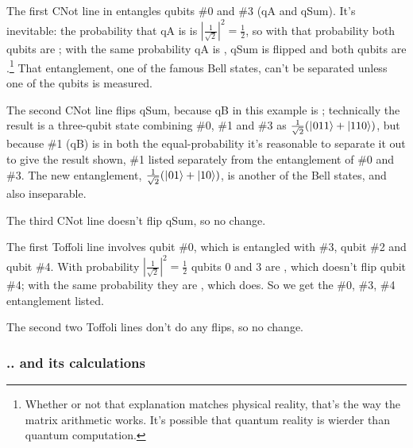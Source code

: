 The first CNot line in  entangles qubits \#0 and \#3 (qA and qSum). It's inevitable: the probability that qA is \zero{} is $|\frac{1}{\sqrt2}|^{2}=\frac{1}{2}$, so with that probability both qubits are \zero{}; with the same probability qA is \one{}, qSum is flipped and both qubits are \one{}.\footnote{Whether or not that explanation matches physical reality, that's the way the matrix arithmetic works. It's possible that quantum reality is wierder than quantum computation.} That entanglement, one of the famous Bell states, can't be separated unless one of the qubits is measured.

The second CNot line flips qSum, because qB in this example is \one{}; technically the result is a three-qubit state combining \#0, \#1 and \#3 as $\frac{1}{\sqrt2}(|\hspace{0.5pt}011\rangle+|110\rangle)$, but because \#1 (qB) is \one{} in both the equal-probability it's reasonable to separate it out to give the result shown, \#1 listed separately from the entanglement of \#0 and \#3. The new entanglement, $\frac{1}{\sqrt2}(|\hspace{0.5pt}01\rangle+|10\rangle)$, is another of the Bell states, and also inseparable.

The third CNot line doesn't flip qSum, so no change.

The first Toffoli line involves qubit \#0, which is entangled with \#3, qubit \#2 and qubit \#4. With probability $|\frac{1}{\sqrt2}|^{2}=\frac{1}{2}$ qubits 0 and 3 are \zeroone, which doesn't flip qubit \#4; with the same probability they are \onezero{}, which does. So we get the \#0, \#3, \#4 entanglement listed.

The second two Toffoli lines don't do any flips, so no change. 

\subsubsection{.. and its calculations}

